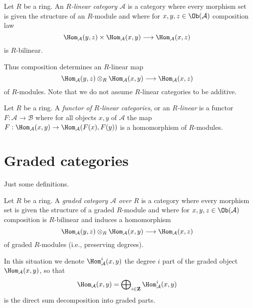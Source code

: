 \begin{definition}
\label{definition-linear-category}
Let $R$ be a ring. An {\it $R$-linear category $\mathcal{A}$} is a category
where every morphism set is given the structure of an $R$-module
and where for $x, y, z \in \Ob(\mathcal{A})$ composition law
$$
\Hom_\mathcal{A}(y, z) \times \Hom_\mathcal{A}(x, y)
\longrightarrow
\Hom_\mathcal{A}(x, z)
$$
is $R$-bilinear.
\end{definition}

\noindent
Thus composition determines an $R$-linear map
$$
\Hom_\mathcal{A}(y, z) \otimes_R \Hom_\mathcal{A}(x, y)
\longrightarrow
\Hom_\mathcal{A}(x, z)
$$
of $R$-modules. Note that we do not assume $R$-linear categories to be
additive.

\begin{definition}
\label{definition-functor-linear-categories}
Let $R$ be a ring. A {\it functor of $R$-linear categories}, or an
{\it $R$-linear} is a functor $F : \mathcal{A} \to \mathcal{B}$
where for all objects $x, y$ of $\mathcal{A}$ the map
$F : \Hom_\mathcal{A}(x, y) \to \Hom_\mathcal{A}(F(x), F(y))$
is a homomorphism of $R$-modules.
\end{definition}







\section{Graded categories}
\label{section-graded}

\noindent
Just some definitions.

\begin{definition}
\label{definition-graded-category}
Let $R$ be a ring. A {\it graded category $\mathcal{A}$
over $R$} is a category where every morphism set is given the structure
of a graded $R$-module and where for
$x, y, z \in \Ob(\mathcal{A})$ composition is $R$-bilinear and induces
a homomorphism
$$
\Hom_\mathcal{A}(y, z) \otimes_R \Hom_\mathcal{A}(x, y)
\longrightarrow
\Hom_\mathcal{A}(x, z)
$$
of graded $R$-modules (i.e., preserving degrees).
\end{definition}

\noindent
In this situation we denote $\Hom_\mathcal{A}^i(x, y)$ the degree $i$
part of the graded object $\Hom_\mathcal{A}(x, y)$, so that
$$
\Hom_\mathcal{A}(x, y) =
\bigoplus\nolimits_{i \in \mathbf{Z}} \Hom_\mathcal{A}^i(x, y)
$$
is the direct sum decomposition into graded parts.

